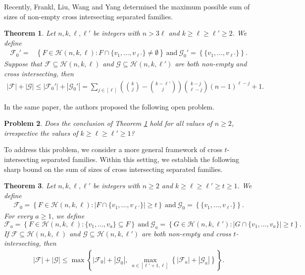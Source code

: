 \documentclass[11pt]{article}
\newtheorem{theorem}{Theorem}[section]
\newtheorem{problem}[theorem]{Problem}
\begin{document}
Recently, Frankl, Liu, Wang and Yang \cite{F23} determined the maximum possible sum of sizes of non-empty cross intersecting separated families.

\begin{theorem}\cite{F23}\label{F23}
 Let $n,k,\ell,\ell'$ be integers with $n>3\ell$ and $k\ge \ell\ge \ell' \ge 2$. We define 
\begin{align*}
\mathcal{F}_0'=&\left \{ F\in\mathcal{H}(n,k,\ell) : F\cap\{v_1,\ldots,v_{\ell'}\}\neq \emptyset\right \} ~\text{and}~ \mathcal{G}_0'=\left \{ \{v_1,\ldots,v_{\ell'}\} \right \}.
     \end{align*}
Suppose that $\mathcal{F}\subseteq\mathcal{H}(n,k,\ell)$ and $\mathcal{G}\subseteq\mathcal{H}(n,k,\ell')$ are both non-empty  and cross intersecting, then
\begin{align*}
        |\mathcal{F}|+ |\mathcal{G}|\le |\mathcal{F}_0'|+|\mathcal{G}_0'|= \sum\limits_{j\in[\ell]} 
     \left(\binom{k}{j}-\binom{k-\ell'}{j}\right)\binom{k-j}{\ell-j}(n-1)^{\ell-j}+1.
     \end{align*}
\end{theorem}

In the same paper, the authors  proposed the following open problem.

\begin{problem}\cite{F23}\label{p1}
Does the conclusion of Theorem \ref{F23} hold for all values of $n\geq 2$, irrespective the values of $k\ge \ell\ge \ell'\geq 1$?
\end{problem}

To address this problem, we consider a more general framework of cross $t$-intersecting separated families. Within this setting, we establish the following sharp  bound on the sum of sizes of cross intersecting separated families.


\begin{theorem}\label{t3}
 Let $n,k,\ell,\ell'$ be integers with $n\geq 2$ and $k\ge \ell\ge \ell' \ge t\geq 1$. We define 
\begin{align*}
\mathcal{F}_0=\left \{ F\in\mathcal{H}(n,k,\ell) :|F\cap\{v_1,\ldots,v_{\ell'}\}|\ge t\right \} ~\text{and}~  \mathcal{G}_0=\left \{\{v_1,\ldots,v_{\ell'}\} \right \}.
     \end{align*}
 For every $a\ge 1$, we define  
\[ \mathcal{F}_a=\left \{ F\in\mathcal{H}(n,k,\ell) :\{v_1,\ldots,v_a\}\subseteq F\right \} ~\text{and}~ 
\mathcal{G}_a=\left \{ G\in\mathcal{H}(n,k,\ell') :|G\cap\{v_1,\ldots,v_a\}|\ge t \right \}.\]
If $\mathcal{F}\subseteq\mathcal{H}(n,k,\ell)$ and $\mathcal{G}\subseteq\mathcal{H}(n,k,\ell')$ are both non-empty  and cross $t$-intersecting, then
\begin{align*}
        |\mathcal{F}|+ |\mathcal{G}|\le\max \left\{|\mathcal{F}_0|+|\mathcal{G}_0|,\ \max_{a\in [\ell'+1 ,\ell] }\left\{|\mathcal{F}_a|+|\mathcal{G}_a|\right\}\right\}.
     \end{align*}
\end{theorem}
\end{document}

